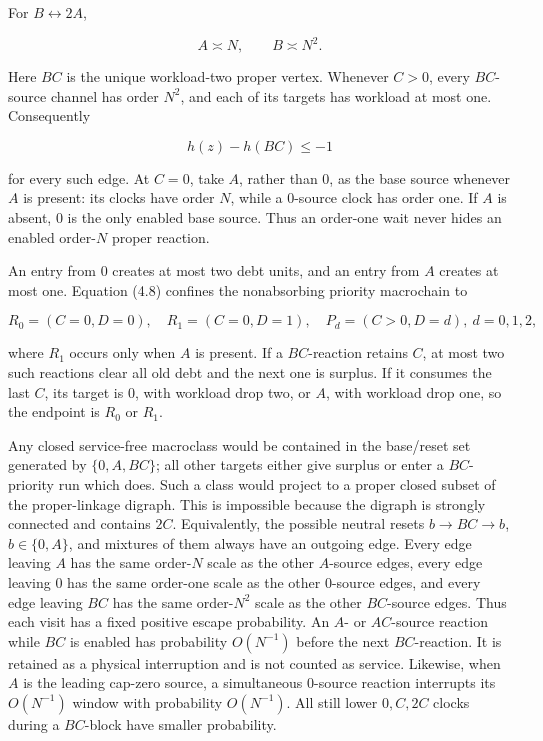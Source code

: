 For \(B\leftrightarrow2A\),

\[
 A\asymp N,\qquad B\asymp N^2.                         \tag{4.7}
\]

Here \(BC\) is the unique workload-two proper vertex. Whenever \(C>0\),
every \(BC\)-source channel has order \(N^2\), and each of its targets
has workload at most one. Consequently

\[
 h(z)-h(BC)\le-1                                      \tag{4.8}
\]

for every such edge. At \(C=0\), take \(A\), rather than \(0\), as the
base source whenever \(A\) is present: its clocks have order \(N\),
while a \(0\)-source clock has order one. If \(A\) is absent, \(0\) is
the only enabled base source. Thus an order-one wait never hides an
enabled order-\(N\) proper reaction.

An entry from \(0\) creates at most two debt units, and an entry from
\(A\) creates at most one. Equation (4.8) confines the nonabsorbing
priority macrochain to

\[
 R_0=(C=0,D=0),\quad R_1=(C=0,D=1),\quad
 P_d=(C>0,D=d),\ d=0,1,2,                              \tag{4.9}
\]

where \(R_1\) occurs only when \(A\) is present. If a \(BC\)-reaction
retains \(C\), at most two such reactions clear all old debt and the
next one is surplus. If it consumes the last \(C\), its target is \(0\),
with workload drop two, or \(A\), with workload drop one, so the
endpoint is \(R_0\) or \(R_1\).

Any closed service-free macroclass would be contained in the base/reset
set generated by \(\{0,A,BC\}\); all other targets either give surplus
or enter a \(BC\)-priority run which does. Such a class would project to
a proper closed subset of the proper-linkage digraph. This is impossible
because the digraph is strongly connected and contains \(2C\).
Equivalently, the possible neutral resets \(b\to BC\to b\),
\(b\in\{0,A\}\), and mixtures of them always have an outgoing edge.
Every edge leaving \(A\) has the same order-\(N\) scale as the other
\(A\)-source edges, every edge leaving \(0\) has the same order-one
scale as the other \(0\)-source edges, and every edge leaving \(BC\) has
the same order-\(N^2\) scale as the other \(BC\)-source edges. Thus each
visit has a fixed positive escape probability. An \(A\)- or
\(AC\)-source reaction while \(BC\) is enabled has probability
\(O(N^{-1})\) before the next \(BC\)-reaction. It is retained as a
physical interruption and is not counted as service. Likewise, when
\(A\) is the leading cap-zero source, a simultaneous \(0\)-source
reaction interrupts its \(O(N^{-1})\) window with probability
\(O(N^{-1})\). All still lower \(0,C,2C\) clocks during a \(BC\)-block
have smaller probability.

